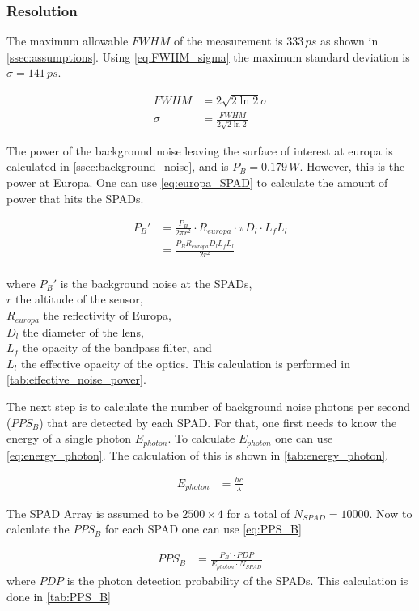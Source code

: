 \subsubsection{Resolution} 
\label{sssec:resolution}

The maximum allowable $FWHM$ of the measurement is $333\,ps$ as shown in \cref{ssec:assumptions}. Using \cref{eq:FWHM_sigma} the maximum standard deviation is $\sigma=141\,ps$.

\begin{align}\label{eq:sigma_FWHM}
	FWHM   &= 2\sqrt{2\ln2}\sigma \\
	\sigma &= \frac{FWHM}{2\sqrt{2\ln2}}\label{eq:FWHM_sigma}
\end{align}

The power of the background noise leaving the surface of interest at europa is calculated in \cref{ssec:background_noise}, and is $P_B = 0.179\,W$. However, this is the power at Europa. One can use \cref{eq:europa_SPAD} to calculate the amount of power that hits the SPADs.

\begin{align}
	P_B' &= \frac{P_B}{2\pi r^2}\cdot R_{europa}\cdot \pi D_l\cdot L_fL_l\\
		 &= \frac{P_BR_{europa}D_lL_fL_l}{2r^2} \label{eq:europa_SPAD}
\end{align}
~\\
where $P_B'$ is the background noise at the SPADs, \\
$r$ the altitude of the sensor, \\
$R_{europa}$ the reflectivity of Europa, \\
$D_l$ the diameter of the lens, \\
$L_f$ the opacity of the bandpass filter, and \\
$L_l$ the effective opacity of the optics. This calculation is performed in \cref{tab:effective_noise_power}.



The next step is to calculate the number of background noise photons per second ($PPS_B$) that are detected by each SPAD. For that, one first needs to know the energy of a single photon $E_{photon}$. To calculate $E_{photon}$ one can use \cref{eq:energy_photon}. The calculation of this is shown in \cref{tab:energy_photon}.

\begin{align}\label{eq:energy_photon}
	E_{photon} &= \frac{hc}{\lambda}
\end{align}



The SPAD Array is assumed to be $2500\times4$ for a total of $N_{SPAD} = 10000$.
Now to calculate the $PPS_B$ for each SPAD one can use \cref{eq:PPS_B}

\begin{align}\label{eq:PPS_B}
	PPS_B &= \frac{P_B'\cdot PDP}{E_{photon}\cdot N_{SPAD}}
\end{align}
where $PDP$ is the photon detection probability of the SPADs. This calculation is done in \cref{tab:PPS_B}


